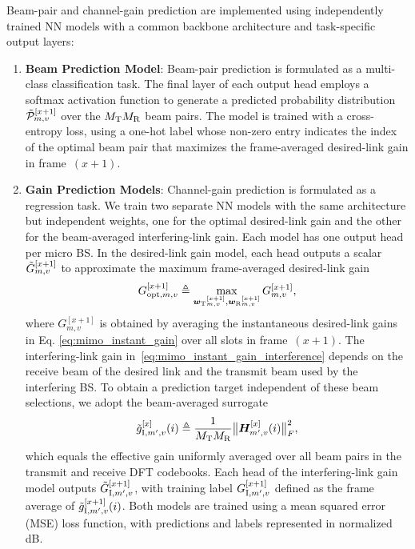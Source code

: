 \documentclass[10pt,journal,letterpaper]{IEEEtran}
\newcommand{\rev}[1]{\textcolor{revisioncolor}{{}#1}}
\newcommand{\omitted}[1]{}
\theoremstyle{remark}
\begin{document}
\omitted{}\rev{Beam-pair and channel-gain prediction are implemented using independently trained NN models with a common backbone architecture and task-specific output layers:}
\begin{enumerate}[label=\arabic*.]
    \item \textbf{Beam Prediction Model}: \omitted{}\rev{Beam-pair} prediction is formulated as a multi-class classification task. The final layer of each output head employs a softmax activation function to generate a predicted probability distribution $\Tilde{\mathcal{P}}_{m,v}^{[x+1]}$ over the $M_{\rm T}M_{\rm R}$ \omitted{}\rev{beam pairs}.
    The model is trained with a cross-entropy loss, using a one-hot label whose non-zero entry indicates the index of the optimal \omitted{}\rev{beam pair} that
    maximizes the \rev{frame-averaged }desired-link gain in \omitted{}\rev{frame~}$(x\!+\!1)$.
    
    \item \textbf{Gain Prediction Models}: \omitted{}\rev{Channel-gain prediction is formulated as a regression task. We train two separate NN models with the same architecture but independent weights, one for the optimal desired-link gain and the other for the beam-averaged interfering-link gain. Each model has one output head per micro BS.}
    In the desired-link \rev{gain }model, each head outputs a scalar $\Tilde{G}_{m,v}^{[x+1]}$ to approximate the \omitted{}\rev{maximum frame-averaged} desired-link gain
    \begin{equation}
        G_{{\rm opt},m,v}^{[x+1]}
        \triangleq
        \max_{{\bm{w}_{\rm T}}_{m,v}^{[x+1]},
              {\bm{w}_{\rm R}}_{m,v}^{[x+1]}} G_{m,v}^{[x+1]},
    \end{equation}
    where $G_{m,v}^{[x+1]}$ is obtained by averaging the instantaneous desired-link gains in Eq. \eqref{eq:mimo_instant_gain} over all slots in frame~$(x\!+\!1)$.
    \omitted{}\rev{The interfering-link gain in~\eqref{eq:mimo_instant_gain_interference} depends on the receive beam of the desired link and the transmit beam used by the interfering BS. To obtain a prediction target independent of these beam selections, we adopt the beam-averaged surrogate}
    {\color{revisioncolor}
    \begin{equation}
        \label{eq:mimo_average_gain_interference}
        \tilde{g}_{{\rm I},m',v}^{[x]}(i)
        \triangleq \frac{1}{M_{\rm T}M_{\rm R}}
        \bigl\|\boldsymbol H_{m',v}^{[x]}(i)\bigr\|_F^2,
    \end{equation}
    }\rev{which equals the effective gain uniformly averaged over all beam pairs in the transmit and receive DFT codebooks. Each head of the interfering-link gain model outputs $\Tilde{G}_{{\rm I},m',v}^{[x+1]}$, with training label $G_{{\rm I},m',v}^{[x+1]}$ defined as the frame average of $\tilde{g}_{{\rm I},m',v}^{[x+1]}(i)$.}
    Both models are trained using a mean \omitted{}\rev{squared} error (MSE) loss function, with predictions and labels represented in normalized dB.
\end{enumerate}
\end{document}
